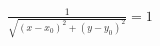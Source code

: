 \documentclass[preview]{standalone}
\begin{document}
\begin{align*}
\frac{1}{\sqrt{(x - x_0) ^ 2 + (y - y_0) ^ 2}} = 1
\end{align*}
\end{document}
